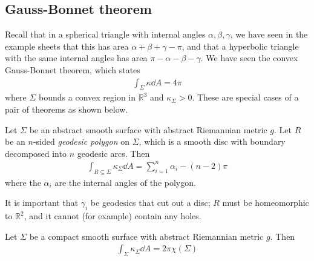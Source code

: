 \subsection{Gauss-Bonnet theorem}
Recall that in a spherical triangle with internal angles $\alpha, \beta, \gamma$, we have seen in the example sheets that this has area $\alpha + \beta + \gamma - \pi$, and that a hyperbolic triangle with the same internal angles has area $\pi - \alpha - \beta - \gamma$.
We have seen the convex Gauss-Bonnet theorem, which states
\begin{align*}
	\int_\Sigma \kappa \dd{A} = 4\pi
\end{align*}
where $\Sigma$ bounds a convex region in $\mathbb R^3$ and $\kappa_\Sigma > 0$.
These are special cases of a pair of theorems as shown below.
\begin{theorem}
	Let $\Sigma$ be an abstract smooth surface with abstract Riemannian metric $g$.
	Let $R$ be an $n$-sided \textit{geodesic polygon} on $\Sigma$, which is a smooth disc with boundary decomposed into $n$ geodesic arcs.
	Then
	\begin{align*}
		\int_{R \subseteq \Sigma} \kappa_\Sigma \dd{A} = \sum_{i=1}^n \alpha_i - (n-2)\pi
	\end{align*}
	where the $\alpha_i$ are the internal angles of the polygon.
\end{theorem}
It is important that $\gamma_i$ be geodesics that cut out a disc; $R$ must be homeomorphic to $\mathbb R^2$, and it cannot (for example) contain any holes.
\begin{theorem}
	Let $\Sigma$ be a compact smooth surface with abstract Riemannian metric $g$.
	Then
	\begin{align*}
		\int_\Sigma \kappa_\Sigma \dd{A} = 2\pi \chi(\Sigma)
	\end{align*}
\end{theorem}
